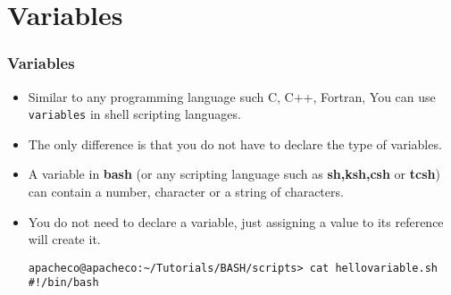 \documentclass[slidestop,mathserif,compress,xcolor=svgnames]{beamer}
\begin{document}
\section{Variables}
\begin{frame}
  \frametitle{\small Variables}
  \begin{itemize}
    \item Similar to any programming language such C, C++, Fortran, You can use \texttt{variables} in shell scripting languages.
    \item The only difference is that you do not have to declare the type of variables.
    \item A variable in \textbf{bash} (or any scripting language such as \textbf{sh,ksh,csh} or \textbf{tcsh}) can contain a number, character or a string of characters.
    \item You do not need to declare a variable, just assigning a value to its reference will create it.
  {\tiny
  \begin{verbatim}
apacheco@apacheco:~/Tutorials/BASH/scripts> cat hellovariable.sh 
#!/bin/bash


\end{verbatim}}
\end{itemize}
\end{frame}
\end{document}
